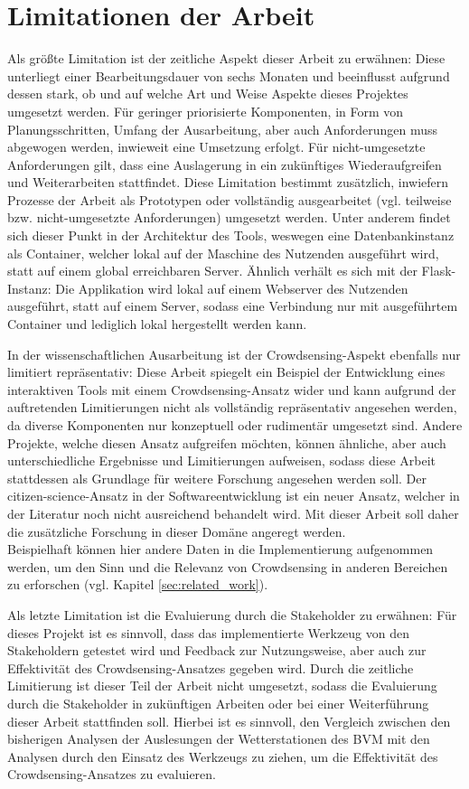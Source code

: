 \section{Limitationen der Arbeit}
\label{sec:limitations}
Als größte Limitation ist der zeitliche Aspekt dieser Arbeit zu erwähnen: Diese unterliegt einer Bearbeitungsdauer von sechs Monaten und beeinflusst aufgrund dessen stark, ob und auf welche Art und Weise Aspekte dieses Projektes umgesetzt werden. Für geringer priorisierte Komponenten, in Form von Planungsschritten, Umfang der Ausarbeitung, aber auch Anforderungen muss abgewogen werden, inwieweit eine Umsetzung erfolgt. Für nicht-umgesetzte Anforderungen gilt, dass eine Auslagerung in ein zukünftiges Wiederaufgreifen und Weiterarbeiten stattfindet. Diese Limitation bestimmt zusätzlich, inwiefern Prozesse der Arbeit als Prototypen oder vollständig ausgearbeitet (vgl. teilweise bzw. nicht-umgesetzte Anforderungen) umgesetzt werden. Unter anderem findet sich dieser Punkt in der Architektur des Tools, weswegen eine Datenbankinstanz als Container, welcher lokal auf der Maschine des Nutzenden ausgeführt wird, statt auf einem global erreichbaren Server. Ähnlich verhält es sich mit der Flask-Instanz: Die Applikation wird lokal auf einem Webserver des Nutzenden ausgeführt, statt auf einem Server, sodass eine Verbindung nur mit ausgeführtem Container und lediglich lokal hergestellt werden kann.

In der wissenschaftlichen Ausarbeitung ist der Crowdsensing-Aspekt ebenfalls nur limitiert repräsentativ: Diese Arbeit spiegelt ein Beispiel der Entwicklung eines interaktiven Tools mit einem Crowdsensing-Ansatz wider und kann aufgrund der auftretenden Limitierungen nicht als vollständig repräsentativ angesehen werden, da diverse Komponenten nur konzeptuell oder rudimentär umgesetzt sind. Andere Projekte, welche diesen Ansatz aufgreifen möchten, können ähnliche, aber auch unterschiedliche Ergebnisse und Limitierungen aufweisen, sodass diese Arbeit stattdessen als Grundlage für weitere Forschung angesehen werden soll. Der citizen-science-Ansatz in der Softwareentwicklung ist ein neuer Ansatz, welcher in der Literatur noch nicht ausreichend behandelt wird. Mit dieser Arbeit soll daher die zusätzliche Forschung in dieser Domäne angeregt werden. \\ Beispielhaft können hier andere Daten in die Implementierung aufgenommen werden, um den Sinn und die Relevanz von Crowdsensing in anderen Bereichen zu erforschen (vgl. Kapitel \ref{sec:related_work}).

Als letzte Limitation ist die Evaluierung durch die Stakeholder zu erwähnen: Für dieses Projekt ist es sinnvoll, dass das implementierte Werkzeug von den Stakeholdern getestet wird und Feedback zur Nutzungsweise, aber auch zur Effektivität des Crowdsensing-Ansatzes gegeben wird. Durch die zeitliche Limitierung ist dieser Teil der Arbeit nicht umgesetzt, sodass die Evaluierung durch die Stakeholder in zukünftigen Arbeiten oder bei einer Weiterführung dieser Arbeit stattfinden soll. Hierbei ist es sinnvoll, den Vergleich zwischen den bisherigen Analysen der Auslesungen der Wetterstationen des \ac{BVM} mit den Analysen durch den Einsatz des Werkzeugs zu ziehen, um die Effektivität des Crowdsensing-Ansatzes zu evaluieren.